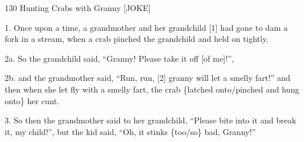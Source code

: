 
130 Hunting Crabs with Granny [JOKE]

1. Once upon a time, a grandmother and her grandchild [1] had gone to dam a fork
in a stream, when a crab pinched the grandchild and held on tightly.

2a. So the grandchild said, ``Granny! Please take it off [of me]!'',

2b. and the grandmother said, ``Run, run, [2] granny will let a smelly fart!''
and then when she let fly with a smelly fart, the crab \{latched onto/pinched and
hung onto\} her cunt.

3. So then the grandmother said to her grandchild, ``Please bite into it and break
it, my child!'', but the kid said, ``Oh, it stinks \{too/so\} bad, Granny!''

